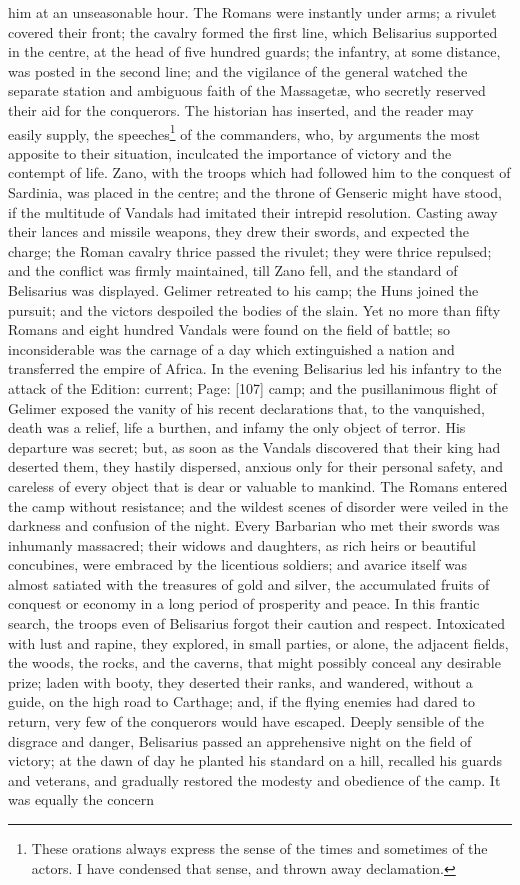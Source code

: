 him at an unseasonable hour. The Romans were instantly under arms; a rivulet covered their front; the cavalry formed the first line, which Belisarius supported in the centre, at the head of five hundred guards; the infantry, at some distance, was posted in the second line; and the vigilance of the general watched the separate station and ambiguous faith of the Massagetæ, who secretly reserved their aid for the conquerors. The historian has inserted, and the reader may easily supply, the speeches\footnote{These orations always express the sense of the times and sometimes of the actors. I have condensed that sense, and thrown away declamation.} of the commanders, who, by arguments the most apposite to their situation, inculcated the importance of victory and the contempt of life. Zano, with the troops which had followed him to the conquest of Sardinia, was placed in the centre; and the throne of Genseric might have stood, if the multitude of Vandals had imitated their intrepid resolution. Casting away their lances and missile weapons, they drew their swords, and expected the charge; the Roman cavalry thrice passed the rivulet; they were thrice repulsed; and the conflict was firmly maintained, till Zano fell, and the standard of Belisarius was displayed. Gelimer retreated to his camp; the Huns joined the pursuit; and the victors despoiled the bodies of the slain. Yet no more than fifty Romans and eight hundred Vandals were found on the field of battle; so inconsiderable was the carnage of a day which extinguished a nation and transferred the empire of Africa. In the evening Belisarius led his infantry to the attack of the Edition: current; Page: [107] camp; and the pusillanimous flight of Gelimer exposed the vanity of his recent declarations that, to the vanquished, death was a relief, life a burthen, and infamy the only object of terror. His departure was secret; but, as soon as the Vandals discovered that their king had deserted them, they hastily dispersed, anxious only for their personal safety, and careless of every object that is dear or valuable to mankind. The Romans entered the camp without resistance; and the wildest scenes of disorder were veiled in the darkness and confusion of the night. Every Barbarian who met their swords was inhumanly massacred; their widows and daughters, as rich heirs or beautiful concubines, were embraced by the licentious soldiers; and avarice itself was almost satiated with the treasures of gold and silver, the accumulated fruits of conquest or economy in a long period of prosperity and peace. In this frantic search, the troops even of Belisarius forgot their caution and respect. Intoxicated with lust and rapine, they explored, in small parties, or alone, the adjacent fields, the woods, the rocks, and the caverns, that might possibly conceal any desirable prize; laden with booty, they deserted their ranks, and wandered, without a guide, on the high road to Carthage; and, if the flying enemies had dared to return, very few of the conquerors would have escaped. Deeply sensible of the disgrace and danger, Belisarius passed an apprehensive night on the field of victory; at the dawn of day he planted his standard on a hill, recalled his guards and veterans, and gradually restored the modesty and obedience of the camp. It was equally the concern 